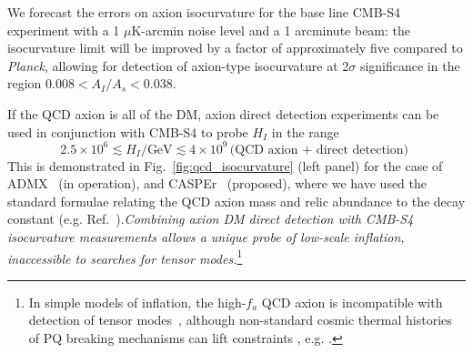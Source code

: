 We forecast the errors on axion isocurvature for the base line CMB-S4 experiment with a 1 $\mu$K-arcmin noise level and a 1 arcminute beam: the isocurvature limit will be improved by a factor of approximately five compared to \emph{Planck}, allowing for detection of axion-type isocurvature at 2$\sigma$ significance in the region $0.008<A_I/A_s<0.038$.

If the QCD axion is all of the DM, axion direct detection experiments can be used in conjunction with CMB-S4 to probe $H_I$ in the range
\begin{equation}
 2.5\times 10^6\lesssim H_I/\text{GeV}\lesssim 4\times 10^9\, 
\text{(QCD axion + direct detection)}\, \,
\end{equation}
This is demonstrated in Fig.~\ref{fig:qcd_isocurvature} (left panel) for the case of ADMX~\cite{Asztalos:2009yp} (in operation), and CASPEr~\cite{Budker:2013hfa} (proposed), where we have used the standard formulae relating the QCD axion mass and relic abundance to the decay constant (e.g. Ref.~\cite{Fox:2004kb}).\emph{Combining axion DM direct detection with CMB-S4 isocurvature measurements allows a unique probe of low-scale inflation, inaccessible to searches for tensor modes.}\footnote{In simple models of inflation, the high-$f_a$ QCD axion is incompatible with detection of tensor modes~\cite{Fox:2004kb,Hertzberg:2008wr,Visinelli:2014twa,Marsh:2014qoa,Visinelli:2014twa}, although non-standard cosmic thermal histories of PQ breaking mechanisms can lift constraints , e.g. \cite{Higaki:2014ooa,Fairbairn:2014zta,Nomura:2015xil}.}

